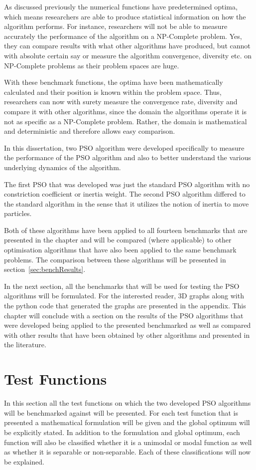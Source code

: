 As discussed previously the numerical functions have predetermined optima, which means researchers are able to produce statistical information on how the algorithm performs. For instance, researchers will not be able to measure accurately the performance of the algorithm on a NP-Complete problem\cite{CompuIntelligenceIntro,FundamentalSwarm}. Yes, they can compare results with what other algorithms have produced, but cannot with absolute certain say or measure the algorithm convergence, diversity etc. on NP-Complete problems as their problem spaces are huge\cite{evalevoalgo}. 

With these benchmark functions, the optima have been mathematically calculated and their position is known within the problem space\cite{evalevoalgo}. Thus, researchers can now with surety measure the convergence rate, diversity and compare it with other algorithms, since the domain the algorithms operate it is not as specific as a NP-Complete problem\cite{evalevoalgo}. Rather, the domain is mathematical and deterministic and therefore allows easy comparison\cite{evalevoalgo}.

In this dissertation, two PSO algorithm were developed specifically to measure the performance of the PSO algorithm and also to better understand the various underlying dynamics of the algorithm.

The first PSO that was developed was just the standard PSO algorithm with no constriction coefficient or inertia weight. The second PSO algorithm differed to the standard algorithm in the sense that it utilizes the notion of inertia to move particles. 

Both of these algorithms have been applied to all fourteen benchmarks that are presented in the chapter and will be compared (where applicable) to other optimisation algorithms that have also been applied to the same benchmark problems. The comparison between these algorithms will be presented in section~\ref{sec:benchResults}.

In the next section, all the benchmarks that will be used for testing the PSO algorithms will be formulated. For the interested reader, 3D graphs along with the python code that generated the graphs are presented in the appendix. This chapter will conclude with a section on the results of the PSO algorithms that were developed being applied to the presented benchmarked as well as compared with other results that have been obtained by other algorithms and presented in the literature.
\section{Test Functions}
In this section all the test functions on which the two developed PSO algorithms will be benchmarked against will be presented. For each test function that is presented a mathematical formulation will be given and the global optimum will be explicitly stated. In addition to the formulation and global optimum, each function will also be classified whether it is a unimodal or modal function as well as whether it is separable or non-separable. Each of these classifications will now be explained.

